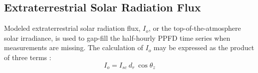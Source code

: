 \subsection{Extraterrestrial Solar Radiation Flux}
\label{sec:ra}
Modeled extraterrestrial solar radiation flux, $I_o$, or the top-of-the-atmosphere solar irradiance, is used to gap-fill the half-hourly PPFD time series when measurements are missing. 
The calculation of $I_o$ may be expressed as the product of three terms \parencite[Eq.~1.10.2]{duffie13}:
%
\begin{equation}
\label{eq:etsr}
    I_o = I_{sc} \: d_{r} \: \cos \theta_z
\end{equation}


